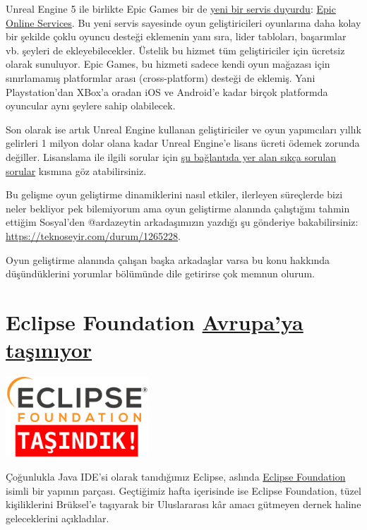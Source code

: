 \documentclass[11pt]{article}
\begin{document}
Unreal Engine 5 ile birlikte Epic Games bir de \href{https://www.unrealengine.com/en-US/blog/epic-online-services-featuring-epic-account-and-game-services}{yeni bir servis duyurdu}: \href{https://dev.epicgames.com/en-US/services}{Epic
Online Services}. Bu yeni servis sayesinde oyun geliştiricileri oyunlarına daha
kolay bir şekilde çoklu oyuncu desteği eklemenin yanı sıra, lider tabloları,
başarımlar vb. şeyleri de ekleyebilecekler. Üstelik bu hizmet tüm
geliştiriciler için ücretsiz olarak sunuluyor. Epic Games, bu hizmeti sadece
kendi oyun mağazası için sınırlamamış platformlar arası (cross-platform)
desteği de eklemiş. Yani Playstation'dan XBox'a oradan iOS ve Android'e kadar
birçok platformda oyuncular aynı şeylere sahip olabilecek.

Son olarak ise artık Unreal Engine kullanan geliştiriciler ve oyun yapımcıları
yıllık gelirleri 1 milyon dolar olana kadar Unreal Engine'e lisans ücreti
ödemek zorunda değiller. Lisanslama ile ilgili sorular için \href{https://www.unrealengine.com/faq}{şu bağlantıda yer
alan sıkça sorulan sorular} kısmına göz atabilirsiniz.

Bu gelişme oyun geliştirme dinamiklerini nasıl etkiler, ilerleyen süreçlerde
bizi neler bekliyor pek bilemiyorum ama oyun geliştirme alanında çalıştığını
tahmin ettiğim Sosyal'den @ardazeytin arkadaşımızın yazdığı şu gönderiye
bakabilirsiniz: \url{https://teknoseyir.com/durum/1265228}.

Oyun geliştirme alanında çalışan başka arkadaşlar varsa bu konu hakkında
düşündüklerini yorumlar bölümünde dile getirirse çok memnun olurum.
\section{Eclipse Foundation \href{https://newsroom.eclipse.org/news/announcements/open-source-software-leader-eclipse-foundation-announces-transition-europe-part}{Avrupa'ya taşınıyor}}
\label{sec:orgd576c30}
\begin{center}
\includegraphics[height=3cm]{gorseller/eclipse-foundation-tasindik.jpg}
\end{center}

Çoğunlukla Java IDE'si olarak tanıdığımız Eclipse, aslında \href{https://www.eclipse.org/}{Eclipse Foundation}
isimli bir yapının parçası. Geçtiğimiz hafta içerisinde ise Eclipse
Foundation, tüzel kişiliklerini Brüksel'e taşıyarak bir Uluslararası kâr amacı
gütmeyen dernek haline geleceklerini açıkladılar.
\end{document}
